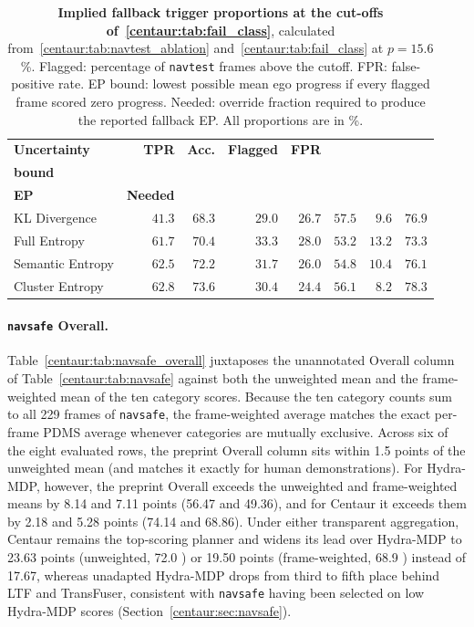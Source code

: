 \begin{table}[t]
  \centering
  \caption[Implied fallback trigger proportions]{\textbf{Implied fallback trigger proportions at the cut-offs of~\ref{centaur:tab:fail_class}}, calculated from~\ref{centaur:tab:navtest_ablation} and~\ref{centaur:tab:fail_class} at $p=15.6$\%. Flagged: percentage of \texttt{navtest} frames above the cutoff. FPR: false-positive rate. EP bound: lowest possible mean ego progress if every flagged frame scored zero progress. Needed: override fraction required to produce the reported fallback EP. All proportions are in \%.}
  \label{centaur:tab:implied_rates}
  \small
  \setlength{\tabcolsep}{4pt}
  \begin{tabular}{l|rr|rr|rrr}
    \toprule
    \textbf{Uncertainty} & \textbf{TPR} & \textbf{Acc.} & \textbf{Flagged} & \textbf{FPR} & \makecell{\textbf{EP}\\\textbf{bound}} & \makecell{\textbf{Reported}\\\textbf{EP}} & \textbf{Needed} \\
    \midrule
    KL Divergence & $41.3$ & $68.3$ & $29.0$ & $26.7$ & $57.5$ & $9.6$ & $76.9$ \\
    Full Entropy & $61.7$ & $70.4$ & $33.3$ & $28.0$ & $53.2$ & $13.2$ & $73.3$ \\
    Semantic Entropy & $62.5$ & $72.2$ & $31.7$ & $26.0$ & $54.8$ & $10.4$ & $76.1$ \\
    Cluster Entropy & $62.8$ & $73.6$ & $30.4$ & $24.4$ & $56.1$ & $8.2$ & $78.3$ \\
    \bottomrule
  \end{tabular}
\end{table}

\paragraph{\texttt{navsafe} Overall.} Table~\ref{centaur:tab:navsafe_overall} juxtaposes the unannotated Overall column of Table~\ref{centaur:tab:navsafe} against both the unweighted mean and the frame-weighted mean of the ten category scores. Because the ten category counts sum to all 229 frames of \texttt{navsafe}, the frame-weighted average matches the exact per-frame PDMS average whenever categories are mutually exclusive. Across six of the eight evaluated rows, the preprint Overall column sits within 1.5 points of the unweighted mean (and matches it exactly for human demonstrations). For Hydra-MDP, however, the preprint Overall exceeds the unweighted and frame-weighted means by 8.14 and 7.11 points (56.47  and 49.36), and for Centaur it exceeds them by 2.18 and 5.28 points (74.14  and 68.86). Under either transparent aggregation, Centaur remains the top-scoring planner and widens its lead over Hydra-MDP to 23.63 points (unweighted, 72.0 ) or 19.50 points (frame-weighted, 68.9 ) instead of 17.67, whereas unadapted Hydra-MDP drops from third to fifth place behind LTF and TransFuser, consistent with \texttt{navsafe} having been selected on low Hydra-MDP scores (Section~\ref{centaur:sec:navsafe}).

